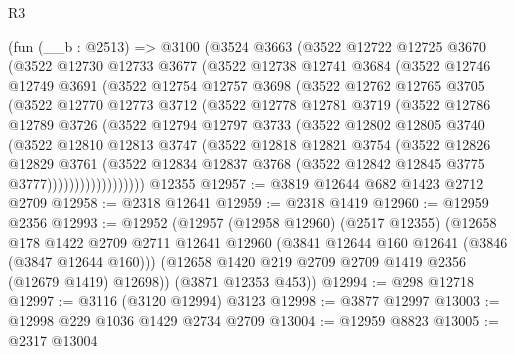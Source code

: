 \begin{lexlean}{R3}
\begin{coremodule}
    (fun (__b : @2513) =>
    @3100
      (@3524
        @3663
        (@3522
          @12722
          @12725
          @3670
          (@3522
            @12730
            @12733
            @3677
            (@3522
              @12738
              @12741
              @3684
              (@3522
                @12746
                @12749
                @3691
                (@3522
                  @12754
                  @12757
                  @3698
                  (@3522
                    @12762
                    @12765
                    @3705
                    (@3522
                      @12770
                      @12773
                      @3712
                      (@3522
                        @12778
                        @12781
                        @3719
                        (@3522
                          @12786
                          @12789
                          @3726
                          (@3522
                            @12794
                            @12797
                            @3733
                            (@3522
                              @12802
                              @12805
                              @3740
                              (@3522
                                @12810
                                @12813
                                @3747
                                (@3522
                                  @12818
                                  @12821
                                  @3754
                                  (@3522
                                    @12826
                                    @12829
                                    @3761
                                    (@3522
                                      @12834
                                      @12837
                                      @3768
                                      (@3522 @12842 @12845 @3775 @3777))))))))))))))))))
    @12355
@12957 := @3819 @12644 @682 @1423 @2712 @2709
@12958 := @2318 @12641
@12959 := @2318 @1419
@12960 := @12959 @2356
@12993 := @12952
    (@12957
      (@12958 @12960)
      (@2517 @12355)
      (@12658
        @178
        @1422
        @2709
        @2711
        @12641
        @12960
        (@3841 @12644 @160 @12641 (@3846 (@3847 @12644 @160)))
        (@12658 @1420 @219 @2709 @2709 @1419 @2356 (@12679 @1419) @12698))
      (@3871 @12353 @453))
@12994 := @298 @12718
@12997 := @3116 (@3120 @12994) @3123
@12998 := @3877 @12997
@13003 := @12998 @229 @1036 @1429 @2734 @2709
@13004 := @12959 @8823
@13005 := @2317 @13004

\end{coremodule}
\end{lexlean}
